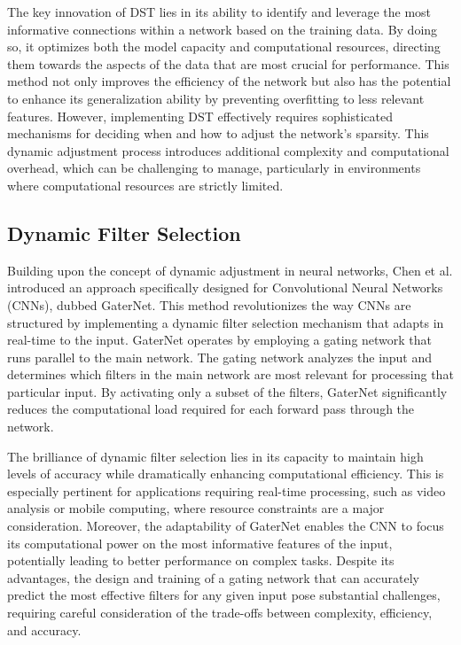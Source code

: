 The key innovation of DST lies in its ability to identify and leverage the most informative connections within a network based on the training data. By doing so, it optimizes both the model capacity and computational resources, directing them towards the aspects of the data that are most crucial for performance. This method not only improves the efficiency of the network but also has the potential to enhance its generalization ability by preventing overfitting to less relevant features. However, implementing DST effectively requires sophisticated mechanisms for deciding when and how to adjust the network's sparsity. This dynamic adjustment process introduces additional complexity and computational overhead, which can be challenging to manage, particularly in environments where computational resources are strictly limited.

\subsection{Dynamic Filter Selection}

Building upon the concept of dynamic adjustment in neural networks, Chen et al. \cite{chen2018} introduced an approach specifically designed for Convolutional Neural Networks (CNNs), dubbed GaterNet. This method revolutionizes the way CNNs are structured by implementing a dynamic filter selection mechanism that adapts in real-time to the input. GaterNet operates by employing a gating network that runs parallel to the main network. The gating network analyzes the input and determines which filters in the main network are most relevant for processing that particular input. By activating only a subset of the filters, GaterNet significantly reduces the computational load required for each forward pass through the network.

The brilliance of dynamic filter selection lies in its capacity to maintain high levels of accuracy while dramatically enhancing computational efficiency. This is especially pertinent for applications requiring real-time processing, such as video analysis or mobile computing, where resource constraints are a major consideration. Moreover, the adaptability of GaterNet enables the CNN to focus its computational power on the most informative features of the input, potentially leading to better performance on complex tasks. Despite its advantages, the design and training of a gating network that can accurately predict the most effective filters for any given input pose substantial challenges, requiring careful consideration of the trade-offs between complexity, efficiency, and accuracy.

